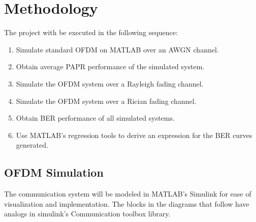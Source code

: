 \chapter{Methodology}
The project with be executed in the following sequence:
\begin{enumerate}[label=\roman*.]
	\item Simulate standard \gls{OFDM} on MATLAB over an \gls{AWGN} channel.
	\item Obtain average \gls{PAPR} performance of the simulated system.
	\item Simulate the \gls{OFDM} system over a Rayleigh fading channel.
	\item Simulate the \gls{OFDM} system over a Rician fading channel.
	\item Obtain \gls{BER} performance of all simulated systems.
	\item Use MATLAB's regression tools to derive an expression for the \gls{BER} curves generated.
\end{enumerate}

\section{OFDM Simulation}
The communication system will be modeled in MATLAB's Simulink for ease of visualization and implementation. The blocks in the diagrams that follow have analogs in \gls{simulink}'s Communication toolbox library.
